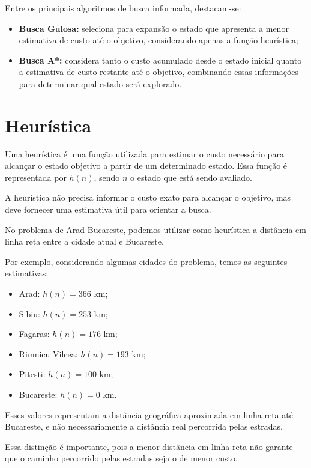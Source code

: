 Entre os principais algoritmos de busca informada, destacam-se:

\begin{itemize}
	\item \textbf{Busca Gulosa:} seleciona para expansão o estado que apresenta a menor estimativa de custo até o objetivo, considerando apenas a função heurística;
	
	\item \textbf{Busca A*:} considera tanto o custo acumulado desde o estado inicial quanto a estimativa de custo restante até o objetivo, combinando essas informações para determinar qual estado será explorado.
\end{itemize}

\section{Heurística}

Uma heurística é uma função utilizada para estimar o custo necessário para alcançar o estado objetivo a partir de um determinado estado. Essa função é representada por $h(n)$, sendo $n$ o estado que está sendo avaliado.

A heurística não precisa informar o custo exato para alcançar o objetivo, mas deve fornecer uma estimativa útil para orientar a busca.

No problema de Arad-Bucareste, podemos utilizar como heurística a distância em linha reta entre a cidade atual e Bucareste.

Por exemplo, considerando algumas cidades do problema, temos as seguintes estimativas:

\begin{itemize}
	\item Arad: $h(n) = 366$ km;
	\item Sibiu: $h(n) = 253$ km;
	\item Fagaras: $h(n) = 176$ km;
	\item Rimnicu Vilcea: $h(n) = 193$ km;
	\item Pitesti: $h(n) = 100$ km;
	\item Bucareste: $h(n) = 0$ km.
\end{itemize}

Esses valores representam a distância geográfica aproximada em linha reta até Bucareste, e não necessariamente a distância real percorrida pelas estradas.

Essa distinção é importante, pois a menor distância em linha reta não garante que o caminho percorrido pelas estradas seja o de menor custo.


